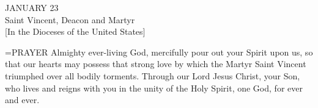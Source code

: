 \begin{center}\normalsize JANUARY 23\\
\footnotesize Saint Vincent, Deacon and Martyr\\
\footnotesize [In the Dioceses of the United States]\\
\end{center}

\hangindent=\parindent \small{PRAYER 
Almighty ever-living God,
mercifully pour out your Spirit upon us,
so that our hearts may possess that strong love
by which the Martyr Saint Vincent
triumphed over all bodily torments.
Through our Lord Jesus Christ, your Son,
who lives and reigns with you in the unity of the Holy Spirit,
one God, for ever and ever.
 \\}
 
